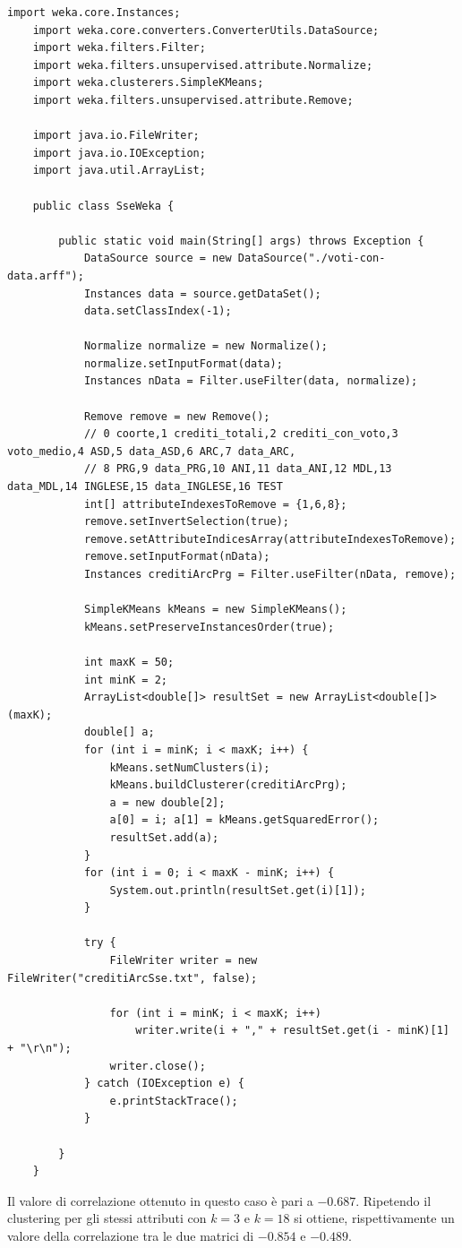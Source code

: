 \documentclass[12pt]{article}
\begin{document}
\begin{lstlisting}[caption={Codice Java per il calcolo di SSE al variare di K}, label={javasse}, captionpos=b, style = java]
	import weka.core.Instances;
	import weka.core.converters.ConverterUtils.DataSource;
	import weka.filters.Filter;
	import weka.filters.unsupervised.attribute.Normalize;
	import weka.clusterers.SimpleKMeans;
	import weka.filters.unsupervised.attribute.Remove;
	
	import java.io.FileWriter;
	import java.io.IOException;
	import java.util.ArrayList;
	
	public class SseWeka {
	
		public static void main(String[] args) throws Exception {
			DataSource source = new DataSource("./voti-con-data.arff");
			Instances data = source.getDataSet();
			data.setClassIndex(-1);
	
			Normalize normalize = new Normalize();
			normalize.setInputFormat(data);
			Instances nData = Filter.useFilter(data, normalize);
	
			Remove remove = new Remove();
			// 0 coorte,1 crediti_totali,2 crediti_con_voto,3 voto_medio,4 ASD,5 data_ASD,6 ARC,7 data_ARC,
			// 8 PRG,9 data_PRG,10 ANI,11 data_ANI,12 MDL,13 data_MDL,14 INGLESE,15 data_INGLESE,16 TEST
			int[] attributeIndexesToRemove = {1,6,8};
			remove.setInvertSelection(true);
			remove.setAttributeIndicesArray(attributeIndexesToRemove);
			remove.setInputFormat(nData);
			Instances creditiArcPrg = Filter.useFilter(nData, remove);
	
			SimpleKMeans kMeans = new SimpleKMeans();
			kMeans.setPreserveInstancesOrder(true);
	
			int maxK = 50;
			int minK = 2;
			ArrayList<double[]> resultSet = new ArrayList<double[]>(maxK);
			double[] a;
			for (int i = minK; i < maxK; i++) {
				kMeans.setNumClusters(i);
				kMeans.buildClusterer(creditiArcPrg);
				a = new double[2];
				a[0] = i; a[1] = kMeans.getSquaredError();
				resultSet.add(a);
			}
			for (int i = 0; i < maxK - minK; i++) {
				System.out.println(resultSet.get(i)[1]);
			}
	
			try {
				FileWriter writer = new FileWriter("creditiArcSse.txt", false);
	
				for (int i = minK; i < maxK; i++)
					writer.write(i + "," + resultSet.get(i - minK)[1] + "\r\n");
				writer.close();
			} catch (IOException e) {
				e.printStackTrace();
			}
	
		}
	}		
\end{lstlisting}
Il valore di correlazione ottenuto in questo caso è pari a $-0.687$.
Ripetendo il clustering per gli stessi attributi con $k=3$ e $k=18$ si ottiene, 
rispettivamente un valore della correlazione tra le due matrici di $-0.854$ e $-0.489$. 
\end{document}
